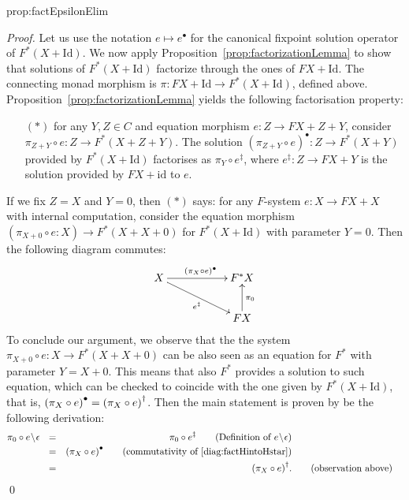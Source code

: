 \documentclass[oribibl,envcountsame,envcountsect,runningheads]{llncs}
\newcommand{\free}[1]{{#1^*}}
\renewcommand{\>}{\rangle}
\def\id{\mathrm{id}}
\def\Id{\mathrm{Id}}
\def\sol#1{{#1}^\bullet}
\def\altsol#1{{#1}^\ddag}
\def\epselim#1{{#1}\!\setminus\! \epsilon}
\def\GF{F} \def\GFG{G} \def\MM{R} \def\quot{\xi} \def\quotG{\gamma}
\newenvironment{proposition_for}[2][\empty]{\bigskip\noindent{\bf
    Proposition~\ref{#2}}\ifthenelse{\equal{#1}{\empty}}{{\bf.}}{ {\bf
      (#1).}}\it}{\vspace{0.5cm}}
\begin{document}
 \begin{proposition_for}[Factorisation property of $e \mapsto \epselim{e}$]{prop:factEpsilonElim}
\propfactEpsilonElim
\end{proposition_for}
\begin{proof}
Let us use the notation $e \mapsto \sol e$ for the canonical fixpoint solution operator of $\free{\GF }(X+\Id)$. We now apply Proposition~\ref{prop:factorizationLemma} to show that solutions of $\free{\GF }(X+\Id)$ factorize through the ones of $\GF X + \Id$. The connecting monad morphism is $\pi : \GF X + \Id \to \free{\GF }(X+\Id)$, defined above. Proposition~\ref{prop:factorizationLemma} yields the following factorisation property:
\begin{itemize}
\item[$(*)$] for any $Y,Z \in C$ and equation morphism $e\colon Z \to \GF X + Z + Y$, consider $\pi_{Z + Y} \circ e \colon Z \to \free{\GF }(X + Z +Y)$. The solution $\sol {(\pi_{Z + Y} \circ e)} \colon Z \to \free{\GF }(X + Y)$ provided by $\free{\GF }(X+\Id)$ factorises as $\pi_Y \circ \altsol e$, where $\altsol e \colon Z \to \GF X +Y$ is the solution provided by $\GF X + \id$ to $e$.
\end{itemize}
If we fix $Z = X$ and $Y = 0$, then $(*)$ says: for any $\GF $-system $e: X \to \GF X + X$ with internal computation, consider the equation morphism $(\pi_{X + 0} \circ e : X) \to \free{\GF }(X + X + 0)$ for $\free{\GF }(X+\Id)$ with parameter $Y = 0$. Then the following diagram commutes:
\begin{equation}\label{diag:factHintoHstar}
\xymatrix{
    X \ar[rr]^{\sol {(\pi_{X} \circ e)}} \ar[drr]_{\altsol e} && \free{\GF }X \\
    && \GF X \ar[u]_{\pi_0}
}
\end{equation}
To conclude our argument, we observe that the the system $\pi_{X + 0} \circ e \colon X \to \free{\GF }(X + X + 0)$ can be also seen as an equation for $\free{\GF }$ with parameter $Y = X + 0$. This means that also $\free{\GF }$ provides a solution to such equation, which can be checked to coincide with the one given by $\free{\GF }(X+\Id)$, that is, $\sol {(\pi_{X} \circ e)} = \cansol {(\pi_{X} \circ e)}$. Then the main statement is proven by be the following derivation:
\begin{align*}
\pi_0 \circ \epselim{e}\ \ &= & \pi_0 \circ \altsol e \tag{Definition of $\epselim{e}$}\\
    & = & \sol {(\pi_{X} \circ e)} \tag{commutativity of \eqref{diag:factHintoHstar}}\\
  & = &\cansol {(\pi_{X} \circ e)}. & \tag{observation above}
\end{align*} \qed
\end{proof}
\end{document}
